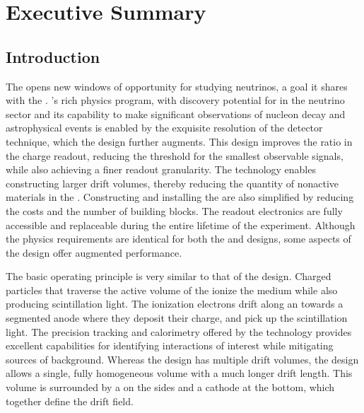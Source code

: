 \chapter{Executive Summary}
\label{ch:dp-execsum}



\section{Introduction}
\label{sec:dp-execsum-introduction}


The    opens new windows of opportunity for studying neutrinos, a goal it shares with the . 
 's rich physics program, with discovery potential for  in the neutrino sector and its capability to make significant observations of nucleon decay and astrophysical events is enabled by the exquisite resolution of the  detector technique, which the  design further augments. This design improves the  ratio in the charge readout, reducing the threshold for the smallest observable signals, while also achieving a finer readout granularity.  The  technology enables constructing larger drift volumes, thereby reducing  the quantity of nonactive materials in the . Constructing and installing the  are also simplified by reducing the costs and the number of  building blocks. The readout electronics are fully accessible and replaceable during the entire lifetime of the experiment. Although the physics requirements are identical for both the  and  designs, some aspects of the  design offer augmented performance. 

The basic operating principle is very similar to that of the  design.  Charged particles that traverse the active volume of the  ionize the medium while also producing scintillation light.  The ionization electrons drift along an \efield towards a segmented anode where they deposit their charge, and  pick up the scintillation light. The precision tracking and calorimetry offered by the  technology provides excellent capabilities for identifying interactions of interest while mitigating sources of background.  Whereas the  design has multiple drift volumes, the  design allows a single, fully homogeneous  volume with a much longer drift length. This volume is surrounded by a  on the sides and a cathode at the bottom, which together define the drift field. 

